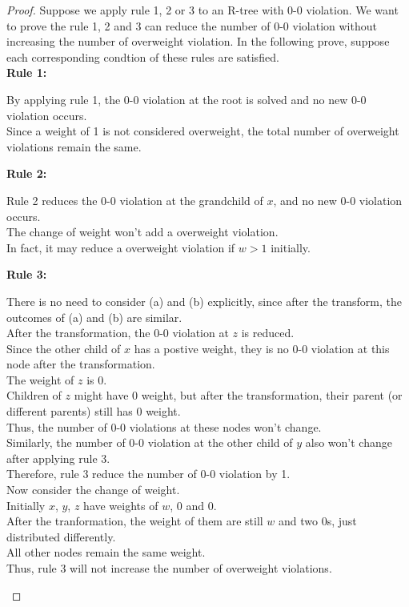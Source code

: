 \documentclass[10pt]{article}
\begin{document}
\begin{enumerate}
\begin{proof}
	Suppose we apply rule 1, 2 or 3 to an R-tree with 0-0 violation. We want to
	prove the rule 1, 2 and 3 can reduce the number of 0-0 violation
	without increasing the number of overweight violation. In the following
	prove, suppose each corresponding condtion of these rules are satisfied. \\		
	\textbf{Rule 1:}
	\begin{addmargin}[1em]{0em}
		By applying rule 1, the 0-0 violation at the root is solved and no new
		0-0 violation occurs.\\
		Since a weight of 1 is not considered overweight, the total number of
		overweight violations remain the same. 
	\end{addmargin}
	\textbf{Rule 2:}
	\begin{addmargin}[1em]{0em}
		Rule 2 reduces the 0-0 violation at the grandchild of $x$, and no new
		0-0 violation occurs. \\
		The change of weight won't add a overweight violation. \\
		In fact, it may reduce a overweight violation if $w > 1$ initially.
	\end{addmargin}
	\textbf{Rule 3:}
	\begin{addmargin}[1em]{0em}
		There is no need to consider (a) and (b) explicitly, since after the transform,
		the outcomes of (a) and (b) are similar. \\
		After the transformation, the 0-0 violation at $z$ is reduced. \\
		Since the other child of $x$ has a postive weight, they is no 0-0
		violation at this node after the transformation. \\
		The weight of $z$ is 0. \\
		Children of $z$ might have 0 weight, but after the transformation,
		their parent (or different parents) still has 0 weight. \\
		Thus, the number of 0-0 violations at these nodes won't change. \\
		Similarly, the number of 0-0 violation at the other child of $y$ also
		won't change after applying rule 3. \\
		Therefore, rule 3 reduce the number of 0-0 violation by 1. \\
		Now consider the change of weight. \\
		Initially $x$, $y$, $z$ have weights of $w$, 0 and 0. \\
		After the tranformation, the weight of them are still $w$ and two 0s,
		just distributed differently. \\
		All other nodes remain the same weight. \\
		Thus, rule 3 will not increase the number of overweight violations.
	\end{addmargin}
	

\end{proof}
\end{enumerate}
\end{document}
